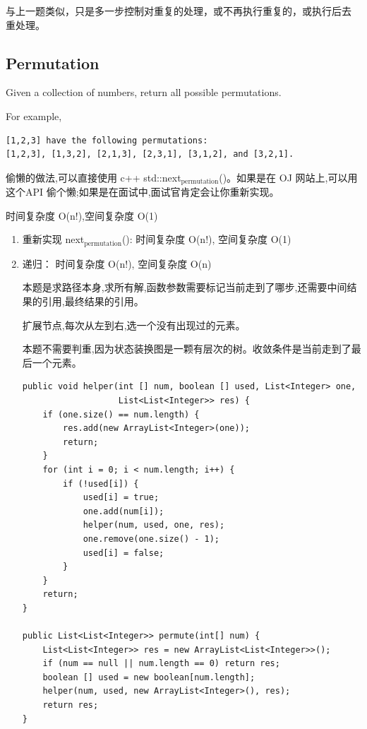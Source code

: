 \documentclass[12pt]{book}
\begin{document}
\begin{enumerate}
与上一题类似，只是多一步控制对重复的处理，或不再执行重复的，或执行后去
重处理。
\end{enumerate}

\subsection{Permutation}
\label{sec-9-1-3}
Given a collection of numbers, return all possible permutations.

For example,
\lstset{language=java,label= ,caption= ,numbers=none}
\begin{lstlisting}
[1,2,3] have the following permutations:
[1,2,3], [1,3,2], [2,1,3], [2,3,1], [3,1,2], and [3,2,1].
\end{lstlisting}

偷懒的做法,可以直接使用 c++ std::next$_{\text{permutation}}$()。如果是在 OJ 网站上,可以用这个API 偷个懒;如果是在面试中,面试官肯定会让你重新实现。

时间复杂度 O(n!),空间复杂度 O(1)

\begin{enumerate}
\item 重新实现 next$_{\text{permutation}}$(): 时间复杂度 O(n!), 空间复杂度 O(1)
\label{sec-9-1-3-1}
\item 递归： 时间复杂度 O(n!), 空间复杂度 O(n)
\label{sec-9-1-3-2}

本题是求路径本身,求所有解,函数参数需要标记当前走到了哪步,还需要中间结果的引用,最终结果的引用。

扩展节点,每次从左到右,选一个没有出现过的元素。

本题不需要判重,因为状态装换图是一颗有层次的树。收敛条件是当前走到了最
后一个元素。

\lstset{language=java,label= ,caption= ,numbers=none}
\begin{lstlisting}
public void helper(int [] num, boolean [] used, List<Integer> one,
                   List<List<Integer>> res) {
    if (one.size() == num.length) {
        res.add(new ArrayList<Integer>(one));
        return;
    }
    for (int i = 0; i < num.length; i++) {
        if (!used[i]) {
            used[i] = true;
            one.add(num[i]);
            helper(num, used, one, res);
            one.remove(one.size() - 1);
            used[i] = false;
        }
    }
    return;
}
        
public List<List<Integer>> permute(int[] num) {
    List<List<Integer>> res = new ArrayList<List<Integer>>();
    if (num == null || num.length == 0) return res;
    boolean [] used = new boolean[num.length];
    helper(num, used, new ArrayList<Integer>(), res);
    return res;
}
\end{lstlisting}
\end{enumerate}
\end{document}
